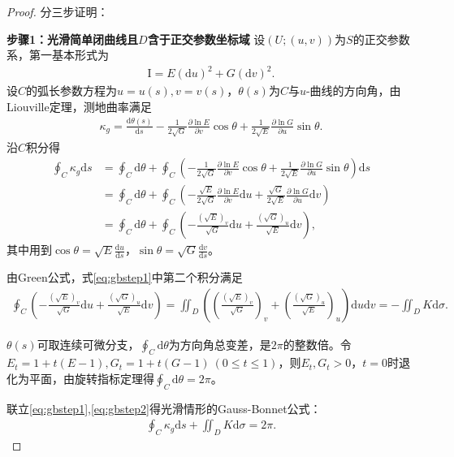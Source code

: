 \documentclass[../../main.tex]{subfiles}%
\begin{document}
\begin{proof}

分三步证明：

\textbf{步骤1：光滑简单闭曲线且$D$含于正交参数坐标域}
设$(U;(u,v))$为$S$的正交参数系，第一基本形式为
\begin{align*}
\mathrm{I}=E(\mathrm{d}u)^2+G(\mathrm{d}v)^2.
\end{align*}
设$C$的弧长参数方程为$u=u(s),v=v(s)$，$\theta(s)$为$C$与$u$-曲线的方向角，由Liouville定理，测地曲率满足
\begin{align*}
\kappa_g=\frac{\mathrm{d}\theta(s)}{\mathrm{d}s}-\frac{1}{2\sqrt{G}}\frac{\partial\ln E}{\partial v}\cos\theta+\frac{1}{2\sqrt{E}}\frac{\partial\ln G}{\partial u}\sin\theta.
\end{align*}
沿$C$积分得
\begin{align}
\oint_{C}\kappa_g\mathrm{d}s&=\oint_{C}\mathrm{d}\theta+\oint_{C}\left(-\frac{1}{2\sqrt{G}}\frac{\partial\ln E}{\partial v}\cos\theta+\frac{1}{2\sqrt{E}}\frac{\partial\ln G}{\partial u}\sin\theta\right)\mathrm{d}s\nonumber\\
&=\oint_{C}\mathrm{d}\theta+\oint_{C}\left(-\frac{\sqrt{E}}{2\sqrt{G}}\frac{\partial\ln E}{\partial v}\mathrm{d}u+\frac{\sqrt{G}}{2\sqrt{E}}\frac{\partial\ln G}{\partial u}\mathrm{d}v\right)\nonumber\\
&=\oint_{C}\mathrm{d}\theta+\oint_{C}\left(-\frac{(\sqrt{E})_v}{\sqrt{G}}\mathrm{d}u+\frac{(\sqrt{G})_u}{\sqrt{E}}\mathrm{d}v\right),\label{eq:gbstep1}
\end{align}
其中用到$\cos\theta=\sqrt{E}\frac{\mathrm{d}u}{\mathrm{d}s}$，$\sin\theta=\sqrt{G}\frac{\mathrm{d}v}{\mathrm{d}s}$。

由Green公式，式\eqref{eq:gbstep1}中第二个积分满足
\begin{align}
\oint_{C}\left(-\frac{(\sqrt{E})_v}{\sqrt{G}}\mathrm{d}u+\frac{(\sqrt{G})_u}{\sqrt{E}}\mathrm{d}v\right)=\iint_{D}\left(\left(\frac{(\sqrt{E})_v}{\sqrt{G}}\right)_v+\left(\frac{(\sqrt{G})_u}{\sqrt{E}}\right)_u\right)\mathrm{d}u\mathrm{d}v=-\iint_{D}K\mathrm{d}\sigma.\label{eq:gbstep2}
\end{align}

$\theta(s)$可取连续可微分支，$\oint_{C}\mathrm{d}\theta$为方向角总变差，是$2\pi$的整数倍。令$E_t=1+t(E-1),G_t=1+t(G-1)\ (0\leqslant t\leqslant1)$，则$E_t,G_t>0$，$t=0$时退化为平面，由旋转指标定理得$\oint_{C}\mathrm{d}\theta=2\pi$。

联立\eqref{eq:gbstep1},\eqref{eq:gbstep2}得光滑情形的Gauss-Bonnet公式：
\begin{align*}
\oint_{C}\kappa_g\mathrm{d}s+\iint_{D}K\mathrm{d}\sigma=2\pi.
\end{align*}


\end{proof}
\end{document}
